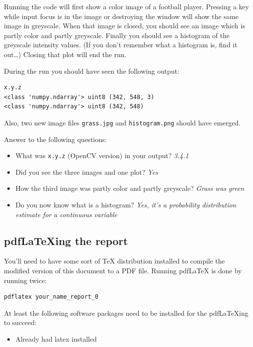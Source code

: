 \documentclass{article}
\begin{document}
Running the code will first show a color image of a football player.
Pressing a key while input focus is in the image or destroying the
window will show the same image in greyscale.  When that image is
closed, you should see an image which is partly color and partly
greyscale.  Finally you should see a histogram of the greyscale
intensity values.  (If you don't remember what a histogram is, find it
out\ldots) Closing that plot will end the run.

During the run you should have seen the following output:

\begin{verbatim}
x.y.z
<class 'numpy.ndarray'> uint8 (342, 548, 3)
<class 'numpy.ndarray'> uint8 (342, 548)
\end{verbatim}

Also, two new image files \texttt{grass.jpg} and
\texttt{histogram.png} should have emerged.

Answer to the following questions:

\begin{itemize}
\item What was \texttt{x.y.z} (OpenCV version) in your output? \emph{3.4.1} 
\item Did you see the three images and one plot? \emph{Yes} 
\item How the third image was partly color and partly greyscale? \emph{Grass was green} 
\item Do you now know what is a histogram? \emph{Yes, it's a probability distribution estimate for a continuous variable} 
\end{itemize}


\subsection{pdf\LaTeX{}ing the report}

You'll need to have some sort of \TeX{} distribution installed to
compile the modified version of this document to a PDF file.  Running
pdf\LaTeX{} is done by running twice:

\begin{verbatim}
pdflatex your_name_report_0
\end{verbatim}

At least the following software packages need to be installed for the
pdf\LaTeX{}ing to succeed:

\begin{itemize}
  \item Already had latex installed
\end{itemize}
\end{document}
